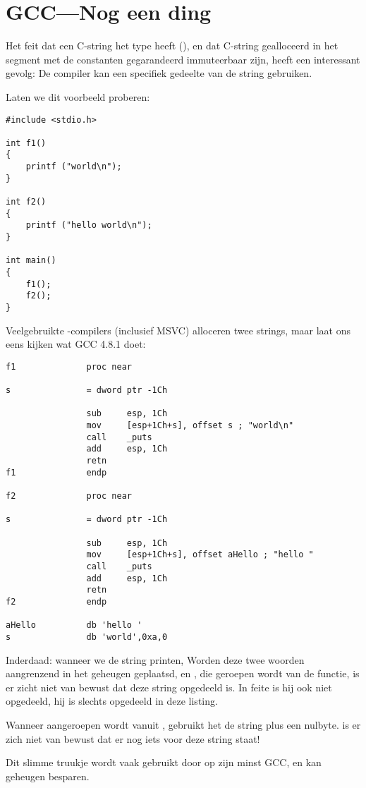 \section{GCC---Nog een ding}
\label{use_parts_of_C_strings}

Het feit dat een  C-string het type  heeft (), 
en dat C-string gealloceerd in het segment met de constanten gegarandeerd immuteerbaar zijn, heeft een interessant gevolg:
De compiler kan een specifiek gedeelte van de string gebruiken.

Laten we dit voorbeeld proberen:

\begin{lstlisting}
#include <stdio.h>

int f1()
{
	printf ("world\n");
}

int f2()
{
	printf ("hello world\n");
}

int main()
{
	f1();
	f2();
}
\end{lstlisting}

Veelgebruikte \CCpp{}-compilers (inclusief MSVC) alloceren twee strings, maar laat ons eens kijken wat GCC 4.8.1 doet:

\begin{lstlisting}[caption=GCC 4.8.1 + \RU{листинг в }IDA\EN{ listing}]
f1              proc near

s               = dword ptr -1Ch

                sub     esp, 1Ch
                mov     [esp+1Ch+s], offset s ; "world\n"
                call    _puts
                add     esp, 1Ch
                retn
f1              endp

f2              proc near

s               = dword ptr -1Ch

                sub     esp, 1Ch
                mov     [esp+1Ch+s], offset aHello ; "hello "
                call    _puts
                add     esp, 1Ch
                retn
f2              endp

aHello          db 'hello '
s               db 'world',0xa,0
\end{lstlisting}

Inderdaad: wanneer we de  string printen, 
Worden deze twee woorden aangrenzend in het geheugen geplaatsd, en \puts, die geroepen wordt van de 
functie, is er zicht niet van bewust dat deze string opgedeeld is. 
In feite is hij ook niet opgedeeld, hij is slechts  opgedeeld in deze listing.

Wanneer \puts aangeroepen wordt vanuit , gebruikt het de  string plus een nulbyte. \puts is er zich niet van bewust dat er nog iets voor deze string staat!

Dit slimme truukje wordt vaak gebruikt door op zijn minst GCC, en kan geheugen besparen.

